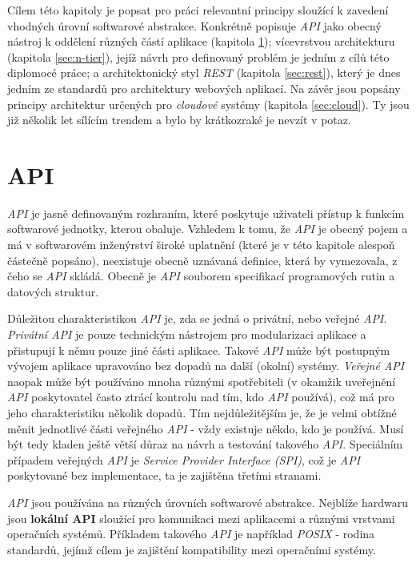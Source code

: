 Cílem této kapitoly je popsat pro práci relevantní principy sloužící k zavedení vhodných úrovní softwarové abstrakce. Konkrétně popisuje \textit{API} jako obecný nástroj k oddělení různých částí aplikace (kapitola \ref{sec:api}); vícevrstvou architekturu (kapitola \ref{sec:n-tier}), jejíž návrh pro definovaný problém je jedním z cílů této diplomocé práce; a architektonický styl \textit{REST} (kapitola \ref{sec:rest}), který je dnes jedním ze standardů pro architektury webových aplikací. Na závěr jsou popsány principy architektur určených pro \textit{cloudové} systémy (kapitola \ref{sec:cloud}). Ty jsou již několik let sílícím trendem a bylo by krátkozraké je nevzít v potaz.

\section{API}
\label{sec:api}
\textit{API} je jasně definovaným rozhraním, které poskytuje uživateli přístup k funkcím softwarové jednotky, kterou obaluje. Vzhledem k tomu, že \textit{API} je obecný pojem a má v softwarovém inženýrství široké uplatnění (které je v této kapitole alespoň částečně popsáno), neexistuje obecně uznávaná definice, která by vymezovala, z čeho se \textit{API} skládá. Obecně je \textit{API} souborem specifikací programových rutin a datových struktur.

Důležitou charakteristikou \textit{API} je, zda se jedná o privátní, nebo veřejné \textit{API}. \textit{Privátní API} je pouze technickým nástrojem pro modularizaci aplikace a přistupují k němu pouze jiné části aplikace. Takové \textit{API} může být postupným vývojem aplikace upravováno bez dopadů na další (okolní) systémy. \textit{Veřejné API} naopak může být používáno mnoha různými spotřebiteli (v okamžik uveřejnění \textit{API} poskytovatel často ztrácí kontrolu nad tím, kdo \textit{API} používá), což má pro jeho charakteristiku několik dopadů. Tím nejdůležitějším je, že je velmi obtížné měnit jednotlivé části veřejného \textit{API} - vždy existuje někdo, kdo je používá. Musí být tedy kladen ještě větší důraz na návrh a testování takového \textit{API}. Speciálním případem veřejných \textit{API} je \textit{Service Provider Interface (SPI)}, což je \textit{API} poskytované bez implementace, ta je zajištěna třetími stranami.

\textit{API} jsou používána na různých úrovních softwarové abstrakce. Nejblíže hardwaru jsou \textbf{lokální API} sloužící pro komunikaci mezi aplikacemi a různými vrstvami operačních systémů. Příkladem takového \textit{API} je například \textit{POSIX} \cite{Posix} - rodina standardů, jejímž cílem je zajištění kompatibility mezi operačními systémy.

